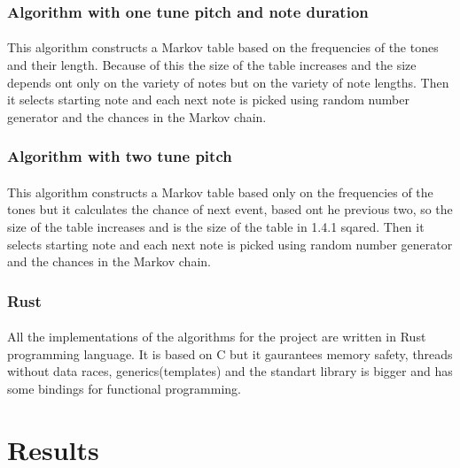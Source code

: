 \documentclass[]{article}
\begin{document}
            \subsubsection{Algorithm with one tune pitch and note duration}
            \paragraph{}This algorithm constructs a Markov table based on the frequencies of the tones and their length. Because of this the size of the table increases and the size depends ont only on the variety of notes but on the variety of note lengths. Then it selects starting note and each next note is picked using random number generator and the chances in the Markov chain.
            \subsubsection{Algorithm with two tune pitch}
            \paragraph{}This algorithm constructs a Markov table based only on the frequencies of the tones but it calculates the chance of next event, based ont he previous two, so the size of the table increases and is the size of the table in 1.4.1 sqared. Then it selects starting note and each next note is picked using random number generator and the chances in the Markov chain.
            \subsubsection{Rust}
            \paragraph{}All the implementations of the algorithms for the project are written in Rust programming language. It is based on C but it gaurantees memory safety, threads without data races, generics(templates) and the standart library is bigger and has some bindings for functional programming.
        \newpage
    \section{Results}
\end{document}
